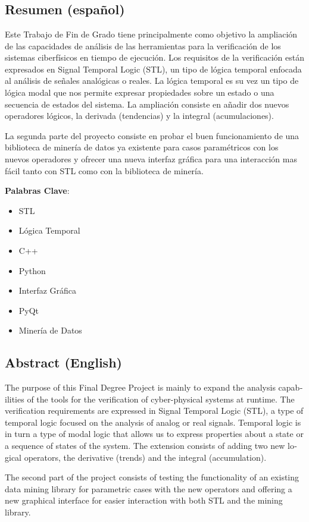 \chapter*{}

\section*{Resumen (español)}
Este Trabajo de Fin de Grado tiene principalmente como objetivo la ampliación de las capacidades de análisis de las herramientas para la verificación de los sistemas ciberfísicos en tiempo de ejecución. Los requisitos de la verificación están expresados en  Signal Temporal Logic (STL), un tipo de lógica temporal enfocada al análisis de señales analógicas o reales. La lógica temporal es su vez un tipo de lógica modal que nos permite expresar propiedades sobre un estado o una secuencia de estados del sistema. La ampliación consiste en añadir dos nuevos operadores lógicos, la derivada (tendencias) y la integral (acumulaciones).

La segunda parte del proyecto consiste en probar el buen funcionamiento de una biblioteca de minería de datos ya existente para casos paramétricos con los nuevos operadores y ofrecer una nueva interfaz gráfica para una interacción mas fácil tanto con STL como con la biblioteca de minería.

\textbf{Palabras Clave}:
\begin{itemize}
\item STL
\item Lógica Temporal
\item C++
\item Python
\item Interfaz Gráfica
\item PyQt
\item Minería de Datos 
\end{itemize}
\newpage

\section*{Abstract (English)}
\begin{otherlanguage}{british}
The purpose of this Final Degree Project is mainly to expand the analysis capabilities of the tools for the verification of cyber-physical systems at runtime. The verification requirements are expressed in Signal Temporal Logic (STL), a type of temporal logic focused on the analysis of analog or real signals. Temporal logic is in turn a type of modal logic that allows us to express properties about a state or a sequence of states of the system. The extension consists of adding two new logical operators, the derivative (trends) and the integral (accumulation).

The second part of the project consists of testing the functionality of an existing data mining library for parametric cases with the new operators and offering a new graphical interface for easier interaction with both STL and the mining library.
\end{otherlanguage}

